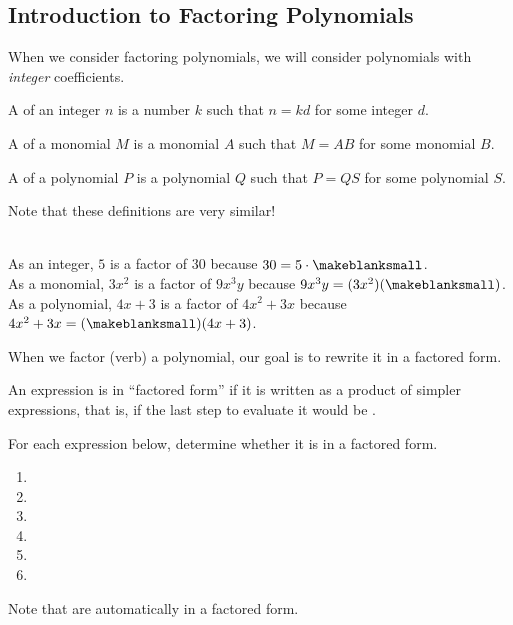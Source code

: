 \subsection{Introduction to Factoring Polynomials} 
When we consider factoring polynomials, we will consider polynomials with \emph{integer} coefficients.
\begin{definition}
\begin{itemize*}
\item A  of an integer $n$ is a number $k$ such that $n=kd$ for some integer $d$.
\item A  of a monomial $M$ is a monomial $A$ such that $M=AB$ for some monomial $B$.
\item A  of a polynomial $P$ is a polynomial $Q$ such that $P=QS$ for some polynomial $S$.
\end{itemize*}
\end{definition}
Note that these definitions are very similar!
\begin{Example}
\\[1ex]As an integer, $5$ is a factor of $30$ because $30=5\cdot\makeblanksmall$.
\\[1ex]As a monomial, $3x^2$ is a factor of $9x^3y$ because $9x^3y=(3x^2)(\makeblanksmall)$.
\\[1ex]As a polynomial, $4x+3$ is a factor of $4x^2+3x$ because $4x^2+3x=(\makeblanksmall)(4x+3)$.
\end{Example}
\noindent When we factor (verb) a polynomial, our goal is to rewrite it in a factored form.
\begin{definition}
An expression is in ``factored form'' if it is written as a product of simpler expressions, that is, if the last step to evaluate it would be \makeblank[1.5in].
\end{definition}
\begin{Example}For each expression below, determine whether it is in a factored form.
\begin{enumerate}\setabc
\item{}
\item{}
\item{}
\item{}
\item{}
\item{}
\end{enumerate}
\end{Example}
\noindent Note that \makeblank[1.5] are automatically in a factored form.